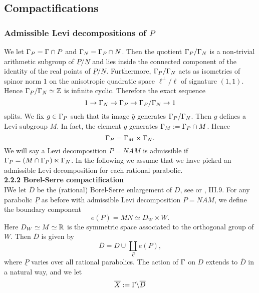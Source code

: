 \subsection{Compactifications}



\subsubsection{Admissible Levi decompositions of $P$}

We let $\Gamma_P = \Gamma \cap P$ and $\Gamma_N = \Gamma_P \cap N$. Then the quotient
$\Gamma_P/\Gamma_N$ is a non-trivial arithmetic subgroup of
$\underline{P}/\underline{N}$ and lies inside the connected component
of the identity of the real points of $\underline{P}/\underline{N}$.
Furthermore, $\Gamma_P/\Gamma_N$ acts as isometries of spinor norm $1$ on
the anisotropic quadratic space $\ell^{\perp}/\ell$  of signature
$(1,1)$. Hence $\Gamma_P/\Gamma_N \simeq \mathbb{Z}$ is infinite cyclic. Therefore
the exact sequence
\begin{equation*} \label{exactsequence}
1 \to \Gamma_N \to \Gamma_P \to \Gamma_P/\Gamma_N \to 1
\end{equation*}
splits. We fix $g \in \Gamma_P$ such that its image $\bar{g}$ generates
$\Gamma_P/\Gamma_N$. Then $g$ defines a Levi subgroup $M$. In fact, the
element $g$ generates $\Gamma_M :=\Gamma_P \cap M$. Hence
\[
\Gamma_P = \Gamma_M \ltimes \Gamma_N.
\]
We will say a Levi decomposition $P = NAM$ is admissible if $
\Gamma_P = (M \cap \Gamma_P) \ltimes \Gamma_N$. In the following we assume that
we have picked an admissible Levi decomposition for each rational
parabolic.
\\[12pt] 
\textbf{2.2.2 Borel-Serre compactification} 
\\[10pt]
IWe let $\overline{D}$ be the (rational) Borel-Serre enlargement
of $D$, see \cite{BorelSerre} or \cite{BJ}, III.9. For any parabolic
$\underline{P}$ as before with admissible Levi decomposition $P=NAM$,
we define the boundary component
\begin{equation*}
e({P}) = MN \simeq D_W \times W.
\end{equation*}
Here $D_W \simeq M \simeq \mathbb{R}$ is the symmetric space associated to the orthogonal group of $W$. Then $\overline{D}$ is given by 
\begin{equation*}
\overline{D} = D \cup \coprod_{\underline{P}} e({P}),
\end{equation*}
where $\underline{P}$ varies over all rational parabolics. The action of $\Gamma$ on $D$ extends to $\overline{D}$ in a natural way, and we let 
\begin{equation*}
\overline{X}:= \Gamma \backslash \overline{D}
\end{equation*}
